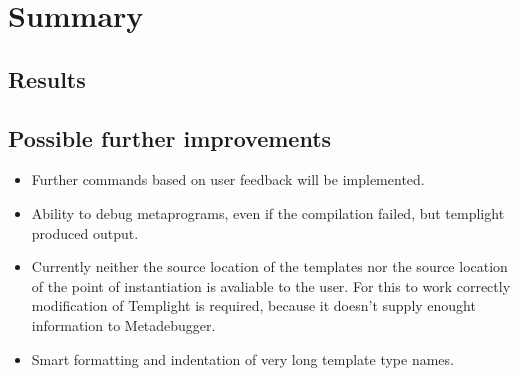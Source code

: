 
\chapter{Summary}

\section{Results}


\section{Possible further improvements}

\begin{itemize}
    \item
        Further commands based on user feedback will be implemented.
    \item
        Ability to debug metaprograms, even if the compilation failed, but
        templight produced output.
    \item
        Currently neither the source location of the templates nor the source
        location of the point of instantiation is avaliable to the user. For
        this to work correctly modification of Templight is required, because
        it doesn't supply enought information to Metadebugger.
    \item
        Smart formatting and indentation of very long template type names.
\end{itemize}
